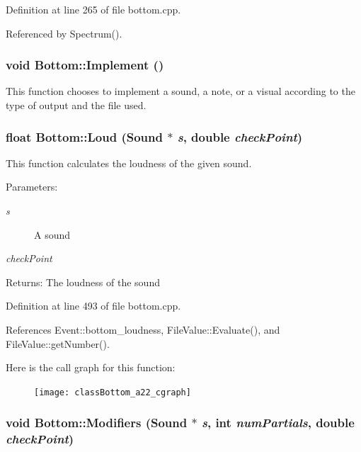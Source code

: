 Definition at line 265 of file bottom.cpp.

Referenced by Spectrum().
\subsubsection{\setlength{\rightskip}{0pt plus 5cm}void Bottom::Implement ()}\label{classBottom_a12}


This function chooses to implement a sound, a note, or a visual according to the type of output and the file used. 
\subsubsection{\setlength{\rightskip}{0pt plus 5cm}float Bottom::Loud (Sound $\ast$ {\em s}, double {\em check\-Point})}\label{classBottom_a22}


This function calculates the loudness of the given sound. \begin{Desc}
\item[Parameters:]
\begin{description}
\item[{\em s}]A sound \item[{\em check\-Point}]\end{description}
\end{Desc}
\begin{Desc}
\item[Returns:]The loudness of the sound \end{Desc}


Definition at line 493 of file bottom.cpp.

References Event::bottom\_\-loudness, File\-Value::Evaluate(), and File\-Value::get\-Number().

Here is the call graph for this function:\begin{figure}[H]
\begin{center}
\leavevmode
\texttt{[image: classBottom\_a22\_cgraph]}
\end{center}
\end{figure}
\subsubsection{\setlength{\rightskip}{0pt plus 5cm}void Bottom::Modifiers (Sound $\ast$ {\em s}, int {\em num\-Partials}, double {\em check\-Point})}\label{classBottom_a23}


